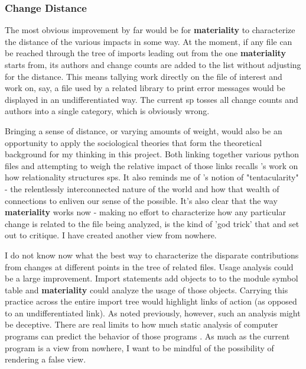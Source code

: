 \documentclass[a4paper,man,natbib,floatsintext]{apa6}
\begin{document}
  \subsubsection{Change Distance}
  The most obvious improvement by far would be for \textbf{materiality} to characterize the distance of the various impacts in some way. At the moment, if any file can be reached through the tree of imports leading out from the one \textbf{materiality} starts from, its authors and change counts are added to the list without adjusting for the distance. This means tallying work directly on the file of interest and work on, say, a file used by a related library to print error messages would be displayed in an undifferentiated way. The current \gls{sp} tosses all change counts and authors into a single category, which is obviously wrong.

  Bringing a sense of distance, or varying amounts of weight, would also be an opportunity to apply the sociological theories that form the theoretical background for my thinking in this project. Both linking together various \Gls{python} files and attempting to weigh the relative impact of those links recalls \citet{Mackenzie2006-hb}'s work on how relationality structures \glspl{sp}. It also reminds me of \citet{Haraway2016-nc}'s notion of "tentacularity" - the relentlessly interconnected nature of the world and how that wealth of connections to enliven our sense of the possible. It's also clear that the way \textbf{materiality} works now - making no effort to characterize how any particular change is related to the file being analyzed, is the kind of 'god trick' that \citet{Harding1992-od} and \citet{Haraway1988-nh} set out to critique. I have created another view from nowhere.

  I do not know now what the best way to characterize the disparate contributions from changes at different points in the tree of related files. Usage analysis could be a large improvement. Import statements add objects to to the module symbol table and \textbf{materiality} could analyze the usage of those objects. Carrying this practice across the entire import tree would highlight links of action (as opposed to an undifferentiated link). As noted previously, however, such an analysis might be deceptive. There are real limits to how much static analysis of computer programs can predict the behavior of those programs \citet{Kaplan_undated-xy}. As much as the current program is a view from nowhere, I want to be mindful of the possibility of rendering a false view.
\end{document}
